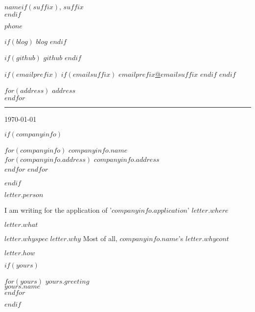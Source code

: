 \documentclass[$fontsize$, a4paper]{article}
\begin{document}
\begin{center}

	{\Huge $name$}$if(suffix)$,  {\large $suffix$}\\[.2cm]$endif$

	\begin{multicols}{3}
		$phone$
		\columnbreak

		$if(blog)$
		\href{http://$blog$}{{\FA \faRss}$blog$}
		$endif$

		$if(github)$
		\href{http://github.com/$github$}{{\FA \faGithub}$github$}
		$endif$

		$if(emailprefix)$
		$if(emailsuffix)$
		\href{mailto:$emailprefix$@$emailsuffix$}{{\FA \faEnvelope}$emailprefix$@$emailsuffix$}
		$endif$
		$endif$

		\columnbreak

		$for(address)$
		$address$\\
		$endfor$

	\end{multicols}
\end{center}


\vspace{-20pt}
\rule{15cm}{0.04cm}
\noindent
\large
\vspace{10pt}

\begin{flushright}
\today\\
\end{flushright}


$if(companyinfo)$
\begin{flushleft}
	$for(companyinfo)$
		\textbf{$companyinfo.name$}\\
		$for(companyinfo.address)$
			$companyinfo.address$\\
		$endfor$
	$endfor$
\end{flushleft}
$endif$


\vspace{4pt}
\begin{flushleft}
$letter.person$\\
\end{flushleft}

\justify
I am writing for the application of '\textbf{$companyinfo.application$}'
$letter.where$\\
\par
$letter.what$\\
\par
$letter.whyspec$ $letter.why$ Most of all, $companyinfo.name$'s $letter.whycont$\\
\par
$letter.how$\\
\par

$if(yours)$
\begin{flushleft}
	$for(yours)$
		$yours.greeting$\\
		$yours.name$\\
	$endfor$
\end{flushleft}
$endif$
\end{document}
